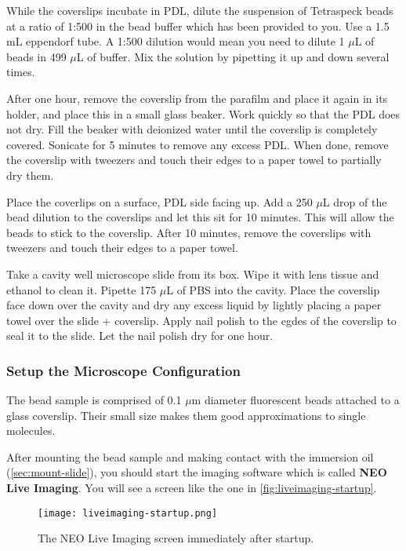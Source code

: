 \documentclass[10pt,a4paper,oneside]{book}
\begin{document}
While the coverslips incubate in PDL, dilute the suspension of Tetraspeck beads at a ratio of 1:500 in the bead buffer which has been provided to you. Use a 1.5 mL eppendorf tube. A 1:500 dilution would mean you need to dilute 1 $\mu$L of beads in 499 $\mu$L of buffer. Mix the solution by pipetting it up and down several times.

After one hour, remove the coverslip from the parafilm and place it again in its holder, and place this in a small glass beaker. Work quickly so that the PDL does not dry. Fill the beaker with deionized water until the coverslip is completely covered. Sonicate for 5 minutes to remove any excess PDL. When done, remove the coverslip with tweezers and touch their edges to a paper towel to partially dry them.

Place the coverlips on a surface, PDL side facing up. Add a 250 $\mu$L drop of the bead dilution to the coverslips and let this sit for 10 minutes. This will allow the beads to stick to the coverslip. After 10 minutes, remove the coverslips with tweezers and touch their edges to a paper towel.

Take a cavity well microscope slide from its box. Wipe it with lens tissue and ethanol to clean it. Pipette 175 $\mu$L of PBS into the cavity. Place the coverslip face down over the cavity and dry any excess liquid by lightly placing a paper towel over the slide + coverslip. Apply nail polish to the egdes of the coverslip to seal it to the slide. Let the nail polish dry for  one hour.

\subsubsection{Setup the Microscope Configuration}

The bead sample is comprised of 0.1 $\mu$m diameter fluorescent beads attached to a glass coverslip. Their small size makes them good approximations to single molecules.

After mounting the bead sample and making contact with the immersion oil (\autoref{sec:mount-slide}), you should start the imaging software which is called \textbf{NEO Live Imaging}. You will see a screen like the one in \autoref{fig:liveimaging-startup}.

\begin{figure}[ht]
    \centering
    \texttt{[image: liveimaging-startup.png]}
    \caption{The NEO Live Imaging screen immediately after startup.}
    \label{fig:liveimaging-startup}
\end{figure}
\end{document}
